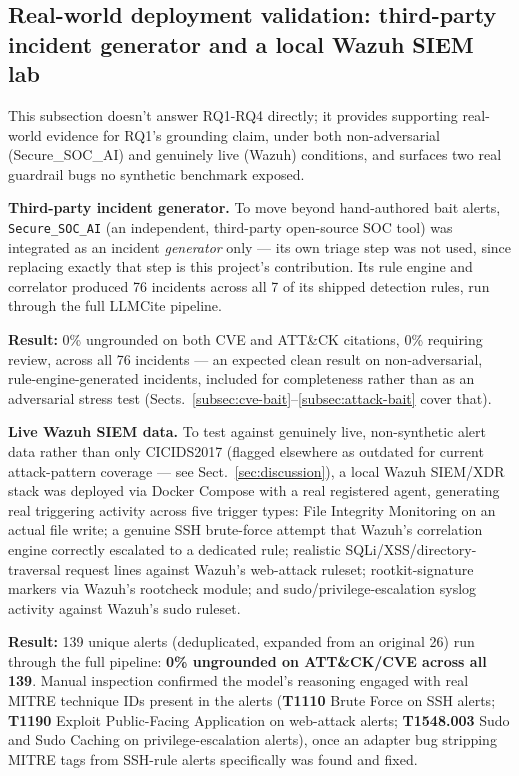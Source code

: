 \documentclass[pdflatex,sn-mathphys-num]{sn-jnl}%
\begin{document}
\subsection{Real-world deployment validation: third-party incident generator and a local Wazuh SIEM lab}\label{subsec:realworld}

This subsection doesn't answer RQ1-RQ4 directly; it provides supporting
real-world evidence for RQ1's grounding claim, under both non-adversarial
(Secure\_SOC\_AI) and genuinely live (Wazuh) conditions, and surfaces two
real guardrail bugs no synthetic benchmark exposed.

\textbf{Third-party incident generator.} To move beyond hand-authored bait alerts, \texttt{Secure\_SOC\_AI}
\cite{securesocai} (an independent, third-party open-source SOC tool)
was integrated as an incident \textit{generator} only --- its own triage
step was not used, since replacing exactly that step is this project's
contribution. Its rule engine and correlator produced 76 incidents
across all 7 of its shipped detection rules, run through the full
LLMCite pipeline.

\textbf{Result:} 0\% ungrounded on both CVE and ATT\&CK citations, 0\%
requiring review, across all 76 incidents --- an expected clean result
on non-adversarial, rule-engine-generated incidents, included for
completeness rather than as an adversarial stress test
(Sects.~\ref{subsec:cve-bait}--\ref{subsec:attack-bait} cover that).

\textbf{Live Wazuh SIEM data.}\label{subsec:wazuh} To test against genuinely live, non-synthetic alert data rather than
only CICIDS2017 \cite{cicids2017} (flagged elsewhere as outdated for
current attack-pattern coverage --- see Sect.~\ref{sec:discussion}), a
local Wazuh \cite{wazuh} SIEM/XDR stack was deployed via Docker Compose
with a real registered agent, generating real triggering activity across
five trigger types: File Integrity Monitoring on an actual file write; a
genuine SSH brute-force attempt that Wazuh's correlation engine
correctly escalated to a dedicated rule; realistic SQLi/XSS/directory-traversal
request lines against Wazuh's web-attack ruleset; rootkit-signature
markers via Wazuh's rootcheck module; and sudo/privilege-escalation
syslog activity against Wazuh's sudo ruleset.

\textbf{Result:} 139 unique alerts (deduplicated, expanded from an
original 26) run through the full pipeline: \textbf{0\% ungrounded on
ATT\&CK/CVE across all 139}. Manual inspection confirmed the model's
reasoning engaged with real MITRE technique IDs present in the alerts
(\textbf{T1110} Brute Force on SSH alerts; \textbf{T1190} Exploit
Public-Facing Application on web-attack alerts; \textbf{T1548.003} Sudo
and Sudo Caching on privilege-escalation alerts), once an adapter bug
stripping MITRE tags from SSH-rule alerts specifically was found and
fixed.
\end{document}

